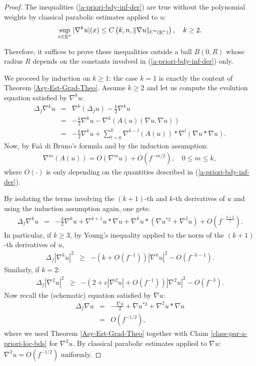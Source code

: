 \documentclass[a4paper,11pt,reqno]{amsart}
\def\R{\mathop{\rm \mathbb{R}}\nolimits}
\begin{document}
\begin{proof}
The inequalities (\ref{a-priori-bdy-inf-der}) are true without the polynomial weights by classical parabolic estimates applied to $u$: 
\begin{eqnarray}
\sup_{x\in\R^n}|\nabla^k u|(x)\leq C\left(k,n,\|\nabla u\|_{C^0(\R^n)}\right),\quad k\geq 2.\label{class-par-a-priori-loc-bds}
\end{eqnarray}

Therefore, it suffices to prove these inequalities outside a ball $B(0,R)$ whose radius $R$ depends on the constants involved in (\ref{a-priori-bdy-inf-der}) only.

We proceed by induction on $k\geq 1$: the case $k=1$ is exactly the content of Theorem \ref{Asy-Est-Grad-Theo}. Assume $k\geq 2$ and let us compute the evolution equation satisfied by $\nabla^k u$:
\begin{eqnarray*}
\Delta_f\nabla^ku&=&\nabla^k(\Delta_fu)-\frac{k}{2}\nabla^ku\\
&=&-\frac{k}{2}\nabla^ku-\nabla^k(A(u)(\nabla u,\nabla u))\\
&=&-\frac{k}{2}\nabla^ku+\sum_{l=0}^k\nabla^{k-l}(A(u))\ast\nabla^l(\nabla u\ast\nabla u).
\end{eqnarray*}
Now, by Fa\`a di Bruno's formula and by the induction assumption:
\begin{eqnarray*}
\nabla^{m}(A(u))=\textit{O}(\nabla^mu)+\textit{O}(f^{-m/2}),\quad 0\leq m\leq k,
\end{eqnarray*}
where $\textit{O}(\cdot)$ is only depending on the quantities described in (\ref{a-priori-bdy-inf-der}).

By isolating the terms involving the $(k+1)$-th and $k$-th derivatives of $u$ and using the induction assumption again, one gets:
\begin{eqnarray*}
\Delta_f\nabla^ku&=&-\frac{k}{2}\nabla^ku+\nabla^{k+1}u\ast\nabla u+\nabla^{k}u\ast(\nabla u^{*2}+\nabla^2u)+\textit{O}\left(f^{-\frac{k+2}{2}}\right).
\end{eqnarray*}
In particular, if $k\geq 3$, by Young's inequality applied to the norm of the $(k+1)$-th derivatives of $u$,
\begin{eqnarray*}
\Delta_f|\nabla^ku|^2&\geq&-\left(k+\textit{O}(f^{-1})\right)|\nabla^ku|^2-\textit{O}\left(f^{-k-1}\right).
\end{eqnarray*}
Similarly, if $k=2$:
\begin{eqnarray*}
\Delta_f|\nabla^2u|^2&\geq&-\left(2+c|\nabla^2u|+\textit{O}(f^{-1})\right)|\nabla^2u|^2-\textit{O}\left(f^{-3}\right).
\end{eqnarray*}
Now recall the (schematic) equation satisfied by $\nabla u$:
\begin{eqnarray*}
\Delta_f\nabla u&=&-\frac{\nabla u}{2}+\nabla u^{*3}+\nabla^2u\ast\nabla u\\
&=&\textit{O}(f^{-1/2}),
\end{eqnarray*}
where we used Theorem \ref{Asy-Est-Grad-Theo} together with Claim \ref{class-par-a-priori-loc-bds} for $\nabla^2u$. By classical parabolic estimates applied to $\nabla u$: $\nabla^2u=\textit{O}(f^{-1/2})$ uniformly.


\end{proof}
\end{document}
